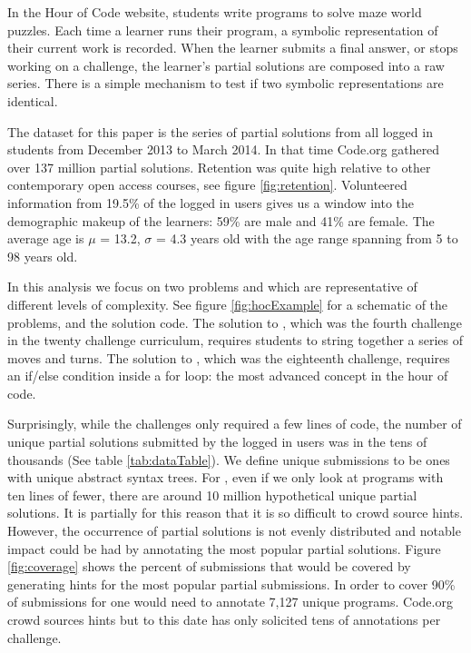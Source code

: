 In the Hour of Code website, students write programs to solve maze world puzzles. Each time a learner runs their program, a symbolic representation of their current work is recorded. When the learner submits a final answer, or stops working on a challenge, the learner’s partial solutions are composed into a raw series. There is a simple mechanism to test if two symbolic representations are identical.

The dataset for this paper is the series of partial solutions from all logged in students from December 2013 to March 2014. In that time Code.org gathered over 137 million partial solutions. Retention was quite high relative to other contemporary open access courses, see figure \ref{fig:retention}. Volunteered information from 19.5\% of the logged in users gives us a window into the demographic makeup of the learners: 59\% are male and 41\% are female. The average age is $\mu$ = 13.2, $\sigma$ = 4.3 years old with the age range spanning from 5 to 98 years old.


In this analysis we focus on two problems \Pa and \Pb which are representative of different levels of complexity. See figure \ref{fig:hocExample} for a schematic of the problems, and the solution code. The solution to \Pa, which was the fourth challenge in the twenty challenge curriculum, requires students to string together a series of moves and turns. The solution to \Pb, which was the eighteenth challenge, requires an if/else condition inside a for loop: the most advanced concept in the hour of code. 

Surprisingly, while the challenges only required a few lines of code, the number of unique partial solutions submitted by the logged in users was in the tens of thousands (See table \ref{tab:dataTable}). We define unique submissions to be ones with unique abstract syntax trees. For \Pb, even if we only look at programs with ten lines of fewer, there are around 10 million hypothetical unique partial solutions. It is partially for this reason that it is so difficult to crowd source hints. However, the occurrence of partial solutions is not evenly distributed and notable impact could be had by annotating the most popular partial solutions. Figure \ref{fig:coverage} shows the percent of submissions that would be covered by generating hints for the most popular partial submissions. In order to cover 90\% of submissions for \Pb one would need to annotate 7,127 unique programs. Code.org crowd sources hints but to this date has only solicited tens of annotations per challenge.

